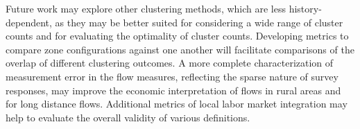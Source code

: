 Future work may explore other clustering methods, which are less history-dependent, as they may be better suited for considering a wide range of cluster counts and for evaluating the optimality of cluster counts. Developing metrics to compare zone configurations against one another will facilitate comparisons of the overlap of different clustering outcomes. A more complete characterization of measurement error in the flow measures, reflecting the sparse nature of survey responses, may improve the economic interpretation of flows in rural areas and for long distance flows. Additional metrics of local labor market integration may help to evaluate the overall validity of various definitions.

